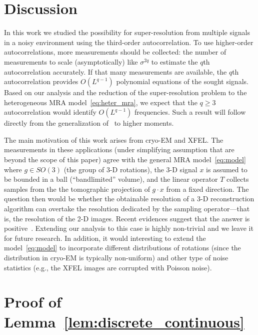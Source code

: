 \documentclass[english,12pt]{article}
\numberwithin{equation}{section}
\numberwithin{thm}{section} %
\begin{document}
\section{Discussion} \label{sec:future_work}


In this work we studied the possibility for super-resolution from multiple signals in a noisy environment using the third-order autocorrelation.
To use higher-order autocorrelations, more measurements should be collected: the number of measurements to scale (asymptotically) like $\sigma^{2q}$ to estimate the $q$th autocorrelation accurately.
If that many measurements are available, the $q$th autocorrelation provides $O(L^{q-1})$ polynomial equations of the sought signals.
Based on our analysis and the reduction of the super-resolution problem to the heterogeneous MRA model~\eqref{eq:heter_mra}, we expect that the $q\geq3$ autocorrelation would identify $O(L^{q-1})$ frequencies. 
Such a  result will follow directly from the generalization of~\cite{bandeira2017estimation} to higher moments. 

The main motivation of this work arises from cryo-EM and XFEL. 
The measurements in these applications  (under simplifying assumption that are beyond the scope of this paper)
agree with the general MRA model~\eqref{eq:model} where $g\in SO(3)$ (the group of 3-D rotations),  the 3-D signal $x$ is assumed to be bounded in a ball (``bandlimited'' volume), and the linear operator $T$ collects samples from the the tomographic projection of $g\cdot x$ from a fixed direction. The question then would be whether the obtainable resolution of a 3-D reconstruction algorithm can overtake the resolution dedicated by the sampling operator---that is, the resolution of the 2-D images. Recent evidences suggest that the answer is positive~\cite{chen2018single}. Extending our analysis to this case is highly non-trivial and we leave it for future research. 
In addition, it would interesting to extend the model~\eqref{eq:model} to incorporate  different distributions of rotations (since the  distribution in cryo-EM is typically non-uniform) and other type of noise statistics (e.g., the  XFEL images are corrupted with Poisson noise).





\appendix

\section{Proof of Lemma~\ref{lem:discrete_continuous}}  
\label{sec:proof_lem:discrete_continuous}
\end{document}
